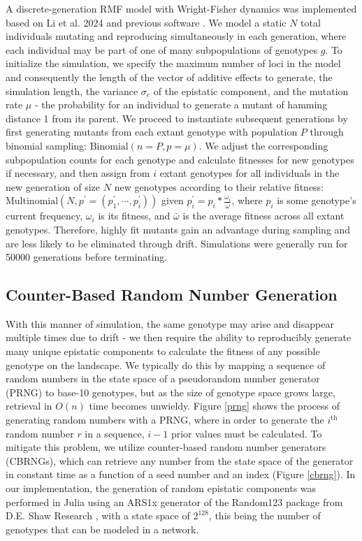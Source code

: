 \documentclass[paper=a4, fontsize=11pt,twoside]{scrartcl}       %
\begin{document}
A discrete-generation RMF model with Wright-Fisher dynamics was implemented based on Li et al. 2024 \cite{liRapidAdaptationRecombining2024} and previous software \cite{amadoSTUNForwardtimeSimulation2023}. We model a static $N$ total individuals mutating and reproducing simultaneously in each generation, where each individual may be part of one of many subpopulations of genotypes $g$. To initialize the simulation, we specify the maximum number of loci in the model and consequently the length of the vector of additive effects to generate, the simulation length, the variance $\sigma_e$ of the epistatic component, and the mutation rate $\mu$ - the probability for an individual to generate a mutant of hamming distance 1 from its parent. We proceed to instantiate subsequent generations by first generating mutants from each extant genotype with population $P$ through binomial sampling: $\text{Binomial}(n = P, p = \mu)$. We adjust the corresponding subpopulation counts for each genotype and calculate fitnesses for new genotypes if necessary, and then assign from $i$ extant genotypes for all individuals in the new generation of size $N$ new genotypes according to their relative fitness: $\text{Multinomial}(N, p^{\prime} = (p^{\prime}_1, \cdots, p^{\prime}_i))$ given $p^{\prime}_i = p_i * \frac{\omega_i}{\bar{\omega}}$, where $p_i$ is some genotype's current frequency, $\omega_i$ is its fitness, and $\bar{\omega}$ is the average fitness across all extant genotypes. Therefore, highly fit mutants gain an advantage during sampling and are less likely to be eliminated through drift. Simulations were generally run for 50000 generations before terminating.

\subsection*{Counter-Based Random Number Generation}

With this manner of simulation, the same genotype may arise and disappear multiple times due to drift - we then require the ability to reproducibly generate many unique epistatic components to calculate the fitness of any possible genotype on the landscape. We typically do this by mapping a sequence of random numbers in the state space of a pseudorandom number generator (PRNG) to base-10 genotypes, but as the size of genotype space grows large, retrieval in $O(n)$ time becomes unwieldy. Figure \ref{prng} shows the process of generating random numbers with a PRNG, where in order to generate the $i^{\text{th}}$ random number $r$ in a sequence, $i-1$ prior values must be calculated. To mitigate this problem, we utilize counter-based random number generators (CBRNGs), which can retrieve any number from the state space of the generator in constant time as a function of a seed number and an index (Figure \ref{cbrng}). In our implementation, the generation of random epistatic components was performed in Julia using an ARS1x generator \cite{JuliaRandomRandom123jl2024} of the Random123 package from D.E. Shaw Research \cite{salmonParallelRandomNumbers2011}, with a state space of $2^{128}$, this being the number of genotypes that can be modeled in a network.
\end{document}
